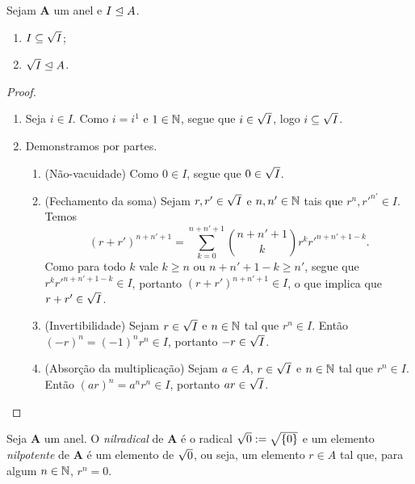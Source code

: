 \begin{proposition}
Sejam $\bm A$ um anel e $I \mathrel{\unlhd} A$.
	\begin{enumerate}
	\item $I \subseteq \sqrt{I}$;
	\item $\sqrt{I} \mathrel{\unlhd} A$.
	\end{enumerate}
\end{proposition}
\begin{proof}
	\begin{enumerate}
	\item Seja $i \in I$. Como $i=i^1$ e $1 \in \mathbb{N}$, segue que $i \in \sqrt{I}$, logo $i \subseteq \sqrt{I}$.

	\item Demonstramos por partes.
		\begin{enumerate}
		\item (Não-vacuidade) Como $0 \in I$, segue que $0 \in \sqrt{I}$.

		\item (Fechamento da soma) Sejam $r,r' \in \sqrt{I}$ e $n,n' \in \mathbb{N}$ tais que $r^n, {r'}^{n'} \in I$. Temos
		\begin{equation*}
		(r+r')^{n+n'+1} = \sum_{k=0}^{n+n'+1}  \binom{n+n'+1}{k} r^k {r'}^{n+n'+1-k}.
		\end{equation*}
Como para todo $k$ vale $k \geq n$ ou $n+n'+1-k \geq n'$, segue que $r^k {r'}^{n+n'+1-k} \in I$, portanto $(r+r')^{n+n'+1} \in I$, o que implica que $r+r' \in \sqrt{I}$.

		\item (Invertibilidade) Sejam $r \in \sqrt{I}$ e $n \in \mathbb{N}$ tal que $r^n \in I$. Então $(-r)^n = (-1)^n r^n \in I$, portanto $-r \in \sqrt{I}$.

		\item (Absorção da multiplicação) Sejam $a \in A$, $r \in \sqrt{I}$ e $n \in \mathbb{N}$ tal que $r^n \in I$. Então $(ar)^n = a^n r^n \in I$, portanto $ar \in \sqrt{I}$.
		\qedhere
		\end{enumerate}
	\end{enumerate}
\end{proof}

\begin{definition}
Seja $\bm A$ um anel. O \emph{nilradical} de $\bm A$ é o radical $\sqrt{0} := \sqrt{\{0\}}$ e um elemento \emph{nilpotente} de $\bm A$ é um elemento de $\sqrt{0}$, ou seja, um elemento $r \in A$ tal que, para algum $n \in \mathbb{N}$, $r^n=0$.
\end{definition}

